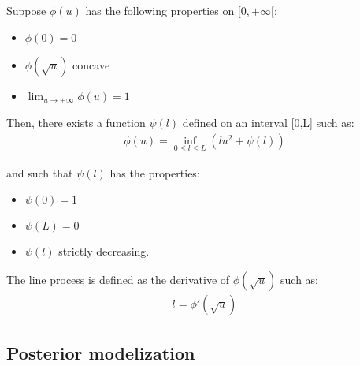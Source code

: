 Suppose $\phi(u)$ has the following properties on $[0,+\infty[$:
\begin{itemize}
\item $\phi(0)=0$
\item $\phi(\sqrt u)$ concave
\item $\lim_{u \rightarrow +\infty} \phi(u)=1$
\end{itemize}

Then, there exists a function $\psi(l)$ defined on an interval [0,L] such as: 
\begin{eqnarray} 
\phi(u) = \inf_{0\leq l\leq L}(lu^2+\psi(l))
\label{mar_eqn_vdl}
\end{eqnarray}

and such that $\psi(l)$ has the properties:
\begin{itemize}
\item $\psi(0)=1$
\item $\psi(L)=0$ 
\item $\psi(l)$ strictly decreasing.
\end{itemize}

The line process is defined as the derivative of  
$\phi(\sqrt u)$ such as:
\begin{eqnarray} 
l = \phi'(\sqrt u) 
\end{eqnarray}

\subsection{Posterior modelization}
 
